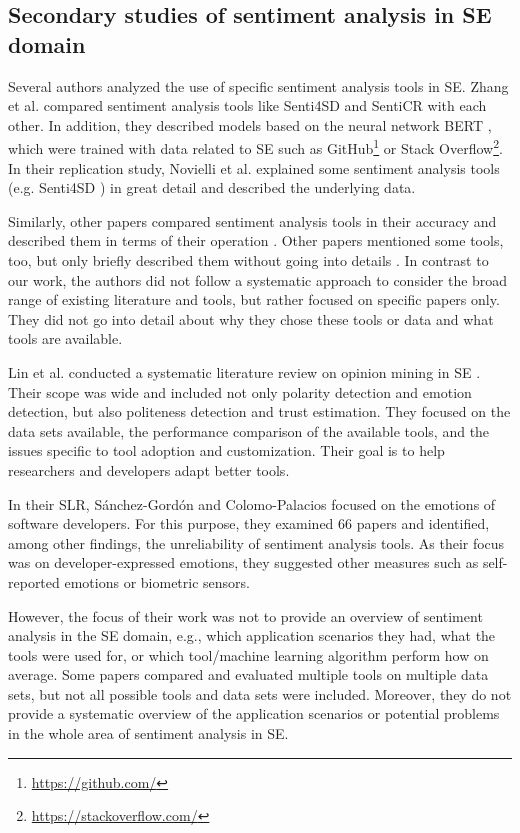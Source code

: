 \subsection{Secondary studies of sentiment analysis in SE domain}

Several authors analyzed the use of specific sentiment analysis tools in SE.
Zhang et al. \cite{9240704} compared sentiment analysis tools like Senti4SD \cite{Calefato.2018} and SentiCR \cite{Ahmed.2017} with each other. In addition, they described models based on the neural network BERT \cite{Devlin.2019}, which were trained with data related to SE such as GitHub\footnote{\url{https://github.com/}} or Stack Overflow\footnote{\url{https://stackoverflow.com/}}. In their replication study, Novielli et al. \cite{Novielli.replication2021} explained some sentiment analysis tools (e.g. Senti4SD \cite{Calefato.2018}) in great detail and described the underlying data.

Similarly, other papers compared sentiment analysis tools in their accuracy and described them in terms of their operation \cite{N.Novielli.2018,Novielli.}. Other papers mentioned some tools, too, but only briefly described them without going into details \cite{Biswas.2019,Chen.2019,Islam.2018c}.
In contrast to our work, the authors did not follow a systematic approach to consider the broad range of existing literature and tools, but rather focused on specific papers only. They did not go into detail about why they chose these tools or data and what tools are available.

Lin et al. conducted a systematic literature review on opinion mining in SE \cite{BinLin.2021}. Their scope was wide and included not only polarity detection and emotion detection, but also politeness detection and trust estimation. They focused on the data sets available, the performance comparison of the available tools, and the issues specific to tool adoption and customization. Their goal is to help researchers and developers adapt better tools.

In their SLR, Sánchez-Gordón and Colomo-Palacios \cite{SANCHEZGORDON201923} focused on the emotions of software developers. For this purpose, they examined 66 papers and identified, among other findings, the unreliability of sentiment analysis tools. As their focus was on developer-expressed emotions, they suggested other measures such as self-reported emotions or biometric sensors.

However, the focus of their work was not to provide an overview of sentiment analysis in the SE domain, e.g., which application scenarios they had, what the tools were used for, or which tool/machine learning algorithm perform how on average. Some papers compared and evaluated multiple tools on multiple data sets, but not all possible tools and data sets were included. Moreover, they do not provide a systematic overview of the application scenarios or potential problems in the whole area of sentiment analysis in SE.
